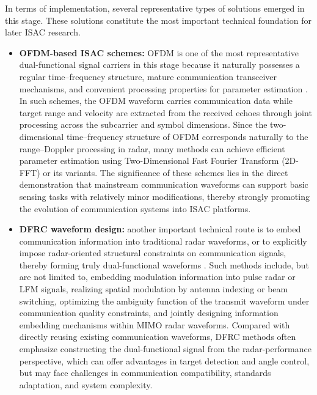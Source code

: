 In terms of implementation, several representative types of solutions emerged in this stage. These solutions constitute the most important technical foundation for later ISAC research.
\begin{itemize}
    \item \textbf{OFDM-based ISAC schemes:} OFDM is one of the most representative dual-functional signal carriers in this stage because it naturally possesses a regular time--frequency structure, mature communication transceiver mechanisms, and convenient processing properties for parameter estimation \cite{Liu2022ISAC,Sturm2011WaveformDesign,Zhou2022integrated}. In such schemes, the OFDM waveform carries communication data while target range and velocity are extracted from the received echoes through joint processing across the subcarrier and symbol dimensions. Since the two-dimensional time--frequency structure of OFDM corresponds naturally to the range--Doppler processing in radar, many methods can achieve efficient parameter estimation using Two-Dimensional Fast Fourier Transform (2D-FFT) or its variants. The significance of these schemes lies in the direct demonstration that mainstream communication waveforms can support basic sensing tasks with relatively minor modifications, thereby strongly promoting the evolution of communication systems into ISAC platforms.
    
    \item \textbf{DFRC waveform design:} another important technical route is to embed communication information into traditional radar waveforms, or to explicitly impose radar-oriented structural constraints on communication signals, thereby forming truly dual-functional waveforms \cite{Hassanien2015dual,Blunt2016overview,Blunt2010Embedding}. Such methods include, but are not limited to, embedding modulation information into pulse radar or LFM signals, realizing spatial modulation by antenna indexing or beam switching, optimizing the ambiguity function of the transmit waveform under communication quality constraints, and jointly designing information embedding mechanisms within MIMO radar waveforms. Compared with directly reusing existing communication waveforms, DFRC methods often emphasize constructing the dual-functional signal from the radar-performance perspective, which can offer advantages in target detection and angle control, but may face challenges in communication compatibility, standards adaptation, and system complexity.
    

\end{itemize}
